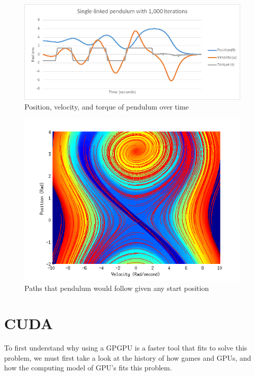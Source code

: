 \documentclass[12pt]{report}
\begin{document}
\begin{figure}
\begin{center}
\includegraphics[scale=1.0]{images/Pendulum_time.png}
\caption{Position, velocity, and torque of pendulum over time}
\label{fig:pendulum_time_plot}
\end{center}
\end{figure}

\begin{figure}
\begin{center}
\includegraphics[scale=0.8]{images/direction_lines.png}
\caption{Paths that pendulum would follow given any start position}
\label{fig:pendulum_plot2}
\end{center}
\end{figure}




\section{CUDA}

To first understand why using a GPGPU is a faster tool that fits to solve this problem, we must first take a look at the history of how games and GPUs, and how the computing model of GPU’s fits this problem.
\end{document}

